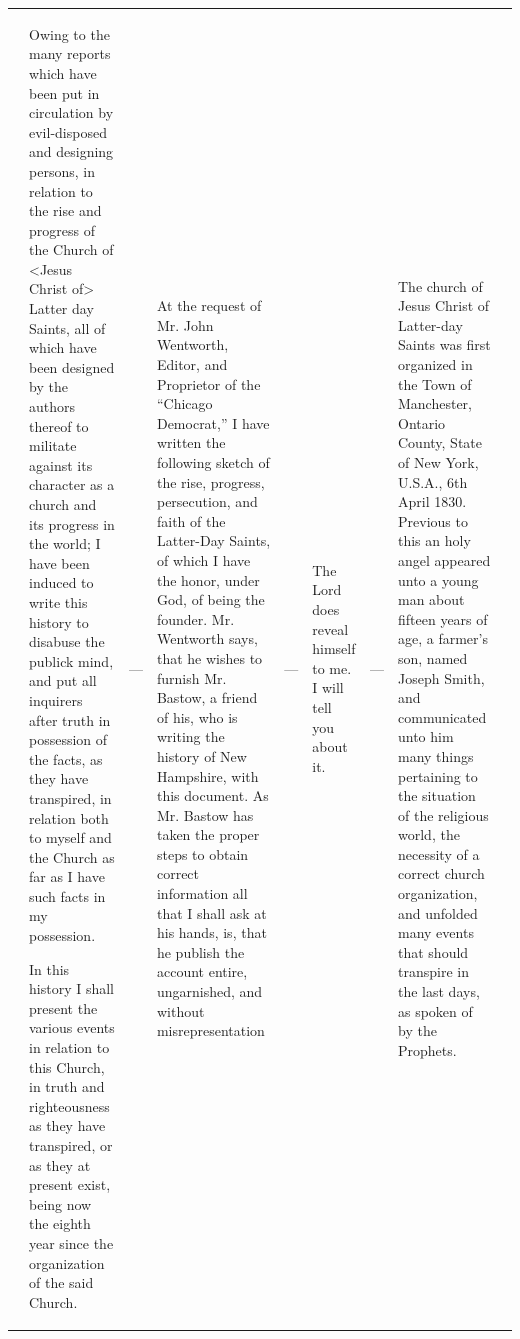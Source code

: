 \begin{tabular}{p{1.7cm}|p{1.7cm}|p{1.7cm}|p{1.7cm}|p{1.7cm}|p{1.7cm}|p{1.7cm}|p{1.7cm}|p{1.7cm}}
{				\phantom{.}} &%
				{\tiny Owing to the many reports which have been put in circulation by evil-disposed and designing persons, in relation to the rise and progress of the Church of <Jesus Christ of> Latter day Saints, all of which have been designed by the authors thereof to militate against its character as a church and its progress in the world; I have been induced to write this history to disabuse the publick mind, and put all inquirers after truth in possession of the facts, as they have transpired, in relation both to myself and the Church as far as I have such facts in my possession.
				
				In this history I shall present the various events in relation to this Church, in truth and righteousness as they have transpired, or as they at present exist, being now the eighth year since the organization of the said Church.
				
				\phantom{.}} &%
				{\tiny ---
				
				\phantom{.}} &%
				{\tiny At the request of Mr. John Wentworth, Editor, and Proprietor of the ``Chicago Democrat,'' I have written the following sketch of the rise, progress, persecution, and faith of the Latter-Day Saints, of which I have the honor, under God, of being the founder. Mr. Wentworth says, that he wishes to furnish Mr. Bastow, a friend of his, who is writing the history of New Hampshire, with this document. As Mr. Bastow has taken the proper steps to obtain correct information all that I shall ask at his hands, is, that he publish the account entire, ungarnished, and without misrepresentation
				
				\phantom{.}} &%
				{\tiny ---
				
				\phantom{.}} &%
				{\tiny The Lord does reveal himself to me. I will tell you about it.
				
				\phantom{.}} &%
				{\tiny ---
				
				\phantom{.}} &%
				{\tiny The church of Jesus Christ of Latter-day Saints was first organized in the Town of Manchester, Ontario County, State of New York, U.S.A., 6th April 1830. Previous to this an holy angel appeared unto a young man about fifteen years of age, a farmer's son, named Joseph Smith, and communicated unto him many things pertaining to the situation of the religious world, the necessity of a correct church organization, and unfolded many events that should transpire in the last days, as spoken of by the Prophets.

}
\end{tabular}
